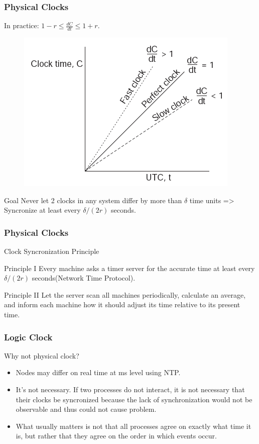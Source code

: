 \begin{frame}
    \frametitle{Physical Clocks}
    \alert{In practice}: $1 - r \le \frac{dC}{dt} \le 1 + r$.
    \begin{figure}
        \centering
        \includegraphics[scale=0.4]{./figures/phys-clock.png}
    \end{figure}
    \begin{block}{Goal}
        Never let 2 clocks in any system differ by more than $\delta$ time units => \\
        Syncronize at least every $\delta/(2r)$ seconds.
    \end{block}
\end{frame}

\begin{frame}
    \frametitle{Physical Clocks}
    Clock Syncronization Principle
    \begin{block}{Principle I}
        Every machine asks a timer server for the accurate time at least every $\delta/(2r)$ seconds(Network Time Protocol).
    \end{block}
    \begin{block}{Principle II}
        Let the server scan all machines periodically, calculate an average, and inform each machine how it should adjust its time relative to its present time.
    \end{block}
\end{frame}

\begin{frame}
    \frametitle{Logic Clock}
    \begin{block}{Why not physical clock?}
        \begin{itemize}
            \item Nodes may differ on real time at ms level using NTP.
            \item It's not necessary. If two processes do not interact, it is not necessary that their clocks be syncronized because the lack of synchronization would not be observable and thus could not cause problem.
            \item What usually matters is not that all processes agree on exactly what time it is, but rather that they agree on the order in which events occur.
        \end{itemize}
    \end{block}
\end{frame}

